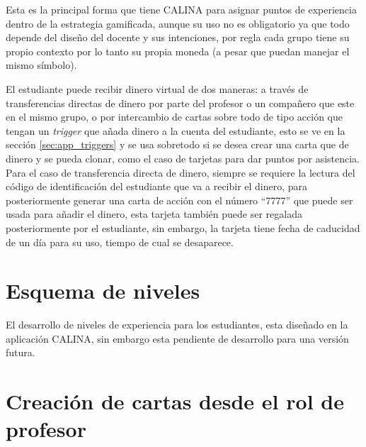 Esta es la principal forma que tiene CALINA para asignar puntos de experiencia dentro de la estrategia 
gamificada, aunque su uso no es obligatorio ya que todo depende del diseño del docente y sus intenciones, por 
regla cada grupo tiene su propio contexto por lo tanto su propia moneda (a pesar que puedan manejar el mismo 
símbolo).

El estudiante puede recibir dinero virtual de dos maneras: a través de transferencias directas de dinero por 
parte del profesor o un compañero que este en el mismo grupo, o por intercambio de cartas sobre todo de tipo 
acción que tengan un \textit{trigger} que añada dinero a la cuenta del estudiante, esto se ve en la sección 
\ref{sec:app_triggers} y se usa sobretodo si se desea crear una carta que de dinero y se pueda clonar, como el 
caso de tarjetas para dar puntos por asistencia. Para el caso de transferencia directa de dinero, siempre se 
requiere la lectura del código de identificación del estudiante que va a recibir el dinero, para 
posteriormente generar una carta de acción con el número ``7777'' que puede ser usada para añadir el dinero, 
esta tarjeta también puede ser regalada posteriormente por el estudiante, sin embargo, la tarjeta tiene fecha 
de caducidad de un día para su uso, tiempo de cual se desaparece.

\section{Esquema de niveles}

El desarrollo de niveles de experiencia para los estudiantes, esta diseñado en la aplicación CALINA, sin 
embargo esta pendiente de desarrollo para una versión futura.

\section{Creación de cartas desde el rol de profesor}
\label{sec:app_creacioncartas}

